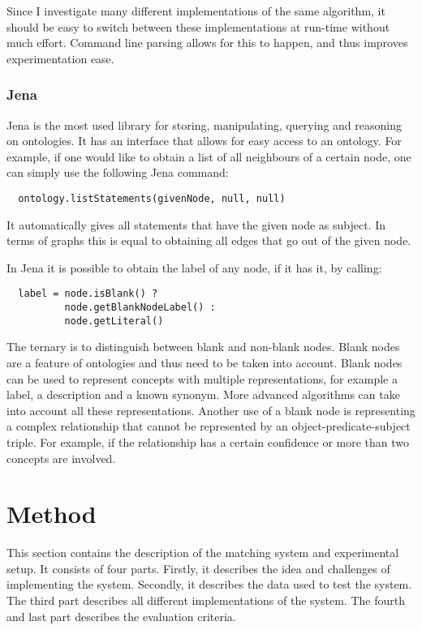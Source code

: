 \documentclass{article}
\begin{document}
 Since I investigate many different implementations of the same algorithm, it should be easy to switch between these implementations at run-time without much effort. Command line parsing allows for this to happen, and thus improves experimentation ease.
 
 \subsubsection{Jena}
 Jena is the most used library for storing, manipulating, querying and reasoning on ontologies\cite{jena}. It has an interface that allows for easy access to an ontology. For example, if one would like to obtain a list of all neighbours of a certain node, one can simply use the following Jena command:
 \lstset{language=Java}
 \begin{lstlisting}
  ontology.listStatements(givenNode, null, null)
 \end{lstlisting}
 
 It automatically gives all statements that have the given node as subject. In terms of graphs this is equal to obtaining all edges that go out of the given node.
 
 In Jena it is possible to obtain the label of any node, if it has it, by calling:
 
 \lstset{language=Java}
 \begin{lstlisting}
  label = node.isBlank() ? 
  		  node.getBlankNodeLabel() : 
  		  node.getLiteral()
 \end{lstlisting}
 
 The ternary is to distinguish between blank and non-blank nodes. Blank nodes are a feature of ontologies and thus need to be taken into account. Blank nodes can be used to represent concepts with multiple representations, for example a label, a description and a known synonym. More advanced algorithms can take into account all these representations. Another use of a blank node is representing a complex relationship that cannot be represented by an object-predicate-subject triple. For example, if the relationship has a certain confidence or more than two concepts are involved.
 
 \newpage
 \section{Method} 
 This section contains the description of the matching system and experimental setup. It consists of four parts. Firstly, it describes the idea and challenges of implementing the system. Secondly, it describes the data used to test the system. The third part describes all different implementations of the system. The fourth and last part describes the evaluation criteria.
 
\end{document}

